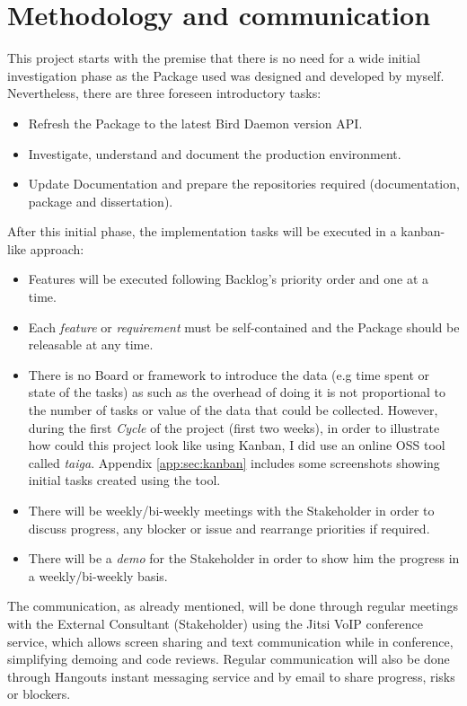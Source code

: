 \section{Methodology and communication}
This project starts with the premise that there is no need for a wide initial investigation phase as the Package used was designed and developed by myself. Nevertheless, there are three foreseen introductory tasks:
\begin{itemize}
    \item Refresh the Package to the latest Bird Daemon version API. 
    \item Investigate, understand and document the production environment.
    \item Update Documentation and prepare the repositories required (documentation, package and dissertation).
\end{itemize}

After this initial phase, the implementation tasks will be executed in a \Gls{kanban}-like approach:
\begin{itemize}
    \item Features will be executed following Backlog's priority order and one at a time.
    \item Each \textit{feature} or \textit{requirement} must be self-contained and the Package should be releasable at any time.
    \item There is no Board or framework to introduce the data (e.g time spent or state of the tasks) as such as the overhead of doing it is not proportional to the number of tasks or value of the data that could be collected. However, during the first \textit{Cycle} of the project (first two weeks), in order to illustrate how could this project look like using Kanban, I did use an online OSS tool called \textit{\Gls{taiga}}. Appendix \ref{app:sec:kanban} includes some screenshots  showing initial tasks created using the tool.
    \item There will be weekly/bi-weekly meetings with the Stakeholder in order to discuss progress, any blocker or issue and rearrange priorities if required.
    \item There will be a \textit{demo} for the Stakeholder in order to show him the progress in a weekly/bi-weekly basis.
\end{itemize}

The communication, as already mentioned, will be done through regular meetings with the External Consultant (Stakeholder) using the Jitsi VoIP conference service, which allows screen sharing and text communication while in conference, simplifying demoing and code reviews. Regular communication will also be done through Hangouts instant messaging service and by email to share progress, risks or blockers.

